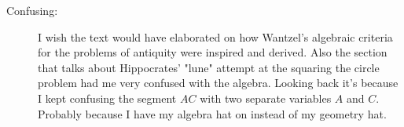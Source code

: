 \documentclass[12pt]{article}
\theoremstyle{homework}
\begin{document}
\begin{description}
\item[Confusing:] I wish the text would have elaborated on how Wantzel's algebraic criteria for the problems of antiquity were inspired and derived. Also the section that 
talks about Hippocrates' "lune" attempt at the squaring the circle problem had me very confused with the algebra. Looking back it's because I kept confusing the segment $AC$ with two separate variables $A$ and $C$. Probably because
I have my algebra hat on instead of my geometry hat.  


\end{description}
\end{document}
